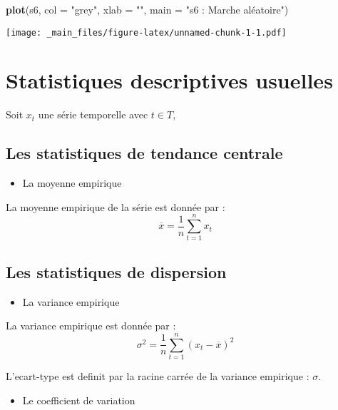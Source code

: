 \documentclass[
]{book}
\newenvironment{Shaded}{\begin{snugshade}}{\end{snugshade}}
\newcommand{\AttributeTok}[1]{\textcolor[rgb]{0.13,0.29,0.53}{#1}}
\newcommand{\FunctionTok}[1]{\textcolor[rgb]{0.13,0.29,0.53}{\textbf{#1}}}
\newcommand{\NormalTok}[1]{#1}
\newcommand{\StringTok}[1]{\textcolor[rgb]{0.31,0.60,0.02}{#1}}
\providecommand{\tightlist}{%
  \setlength{\itemsep}{0pt}\setlength{\parskip}{0pt}}
\theoremstyle{definition}
\theoremstyle{definition}
\theoremstyle{definition}
\theoremstyle{definition}
\theoremstyle{remark}
\begin{document}
\begin{Shaded}
\begin{Highlighting}[]
\FunctionTok{plot}\NormalTok{(s6, }\AttributeTok{col =} \StringTok{"grey"}\NormalTok{, }\AttributeTok{xlab =} \StringTok{""}\NormalTok{, }\AttributeTok{main =} \StringTok{"s6 : Marche aléatoire"}\NormalTok{)}
\end{Highlighting}
\end{Shaded}

\texttt{[image: \_main\_files/figure-latex/unnamed-chunk-1-1.pdf]}

\hypertarget{statistiques-descriptives-usuelles}{%
\section{Statistiques descriptives usuelles}\label{statistiques-descriptives-usuelles}}

Soit \(x_t\) une série temporelle avec \(t \in T\),

\hypertarget{les-statistiques-de-tendance-centrale}{%
\subsection{Les statistiques de tendance centrale}\label{les-statistiques-de-tendance-centrale}}

\begin{itemize}
\tightlist
\item
  La moyenne empirique
\end{itemize}

La moyenne empirique de la série est donnée par :
\[\overline{x} = \frac{1}{n} \sum_{t=1}^{n} x_{t}\]

\hypertarget{les-statistiques-de-dispersion}{%
\subsection{Les statistiques de dispersion}\label{les-statistiques-de-dispersion}}

\begin{itemize}
\tightlist
\item
  La variance empirique
\end{itemize}

La variance empirique est donnée par :
\[\sigma^2 = \frac{1}{n} \sum_{t=1}^{n} (x_t - \overline{x})^2 \]

L'ecart-type est definit par la racine carrée de la variance empirique : \(\sigma\).

\begin{itemize}
\tightlist
\item
  Le coefficient de variation
\end{itemize}
\end{document}
